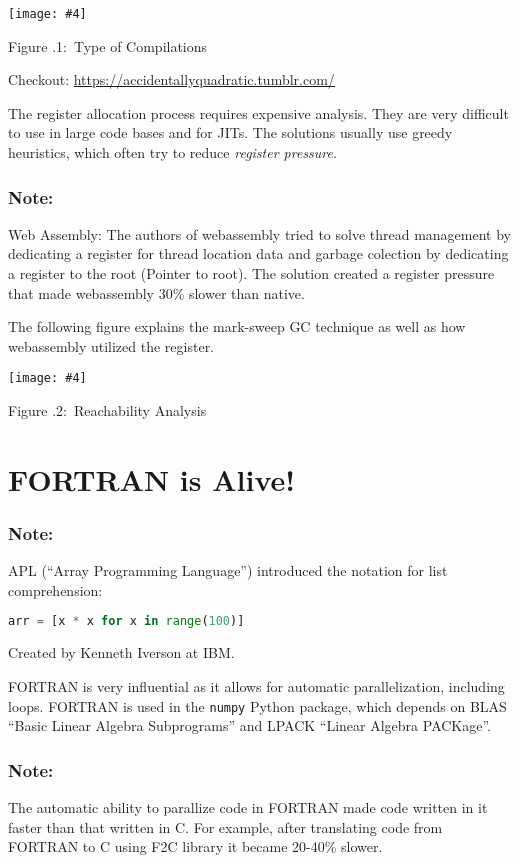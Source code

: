 \documentclass[twoside]{article}
\newcounter{lecnum}
\newcommand{\fig}[4]{
            \centerline{\texttt{[image: \#4]}}
            \begin{center}
            Figure \thelecnum.#1:~#3
            \end{center}
    }
\begin{document}
\fig{1}{0.6}{Type of Compilations}{jit.drawio.png}

Checkout: \url{https://accidentallyquadratic.tumblr.com/}


The register allocation process requires expensive analysis. They are very difficult to use in large code bases and for JITs. The solutions usually use greedy heuristics, which often try to reduce \emph{register pressure}.


\subsubsection*{Note:}
Web Assembly: The authors of webassembly tried to solve thread management by dedicating a register for thread location data and garbage colection by dedicating a register to the root (Pointer to root). The solution created a register pressure that made webassembly 30\% slower than native.


The following figure explains the mark-sweep GC technique as well as how webassembly utilized the register.
\fig{2}{0.6}{Reachability Analysis}{reachabilityanalysis.drawio.png}


\section{FORTRAN is Alive!}
\subsubsection*{Note:}
APL (``Array Programming Language'') introduced the notation for list comprehension:
\begin{lstlisting}[language=Python]
    arr = [x * x for x in range(100)]
\end{lstlisting}
Created by Kenneth Iverson at IBM.

FORTRAN is very influential as it allows for automatic parallelization, including loops.
FORTRAN is used in the \texttt{numpy} Python package, which depends on BLAS ``Basic Linear Algebra Subprograms'' and
LPACK ``Linear Algebra PACKage''.

\subsubsection*{Note:}
The automatic ability to parallize code in FORTRAN made code written in it faster than that written in C.
For example, after translating code from FORTRAN to C using F2C library it became 20-40\% slower.  
\end{document}
